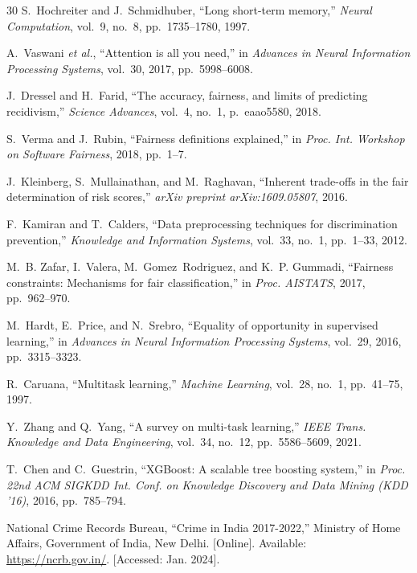 \documentclass[conference]{IEEEtran}
\begin{document}
\begin{thebibliography}{30}
S.~Hochreiter and J.~Schmidhuber, ``Long short-term memory,'' \textit{Neural Computation}, vol.~9, no.~8, pp.~1735--1780, 1997.

A.~Vaswani \textit{et al.}, ``Attention is all you need,'' in \textit{Advances in Neural Information Processing Systems}, vol.~30, 2017, pp.~5998--6008.

J.~Dressel and H.~Farid, ``The accuracy, fairness, and limits of predicting recidivism,'' \textit{Science Advances}, vol.~4, no.~1, p.~eaao5580, 2018.

S.~Verma and J.~Rubin, ``Fairness definitions explained,'' in \textit{Proc. Int. Workshop on Software Fairness}, 2018, pp.~1--7.

J.~Kleinberg, S.~Mullainathan, and M.~Raghavan, ``Inherent trade-offs in the fair determination of risk scores,'' \textit{arXiv preprint arXiv:1609.05807}, 2016.

F.~Kamiran and T.~Calders, ``Data preprocessing techniques for discrimination prevention,'' \textit{Knowledge and Information Systems}, vol.~33, no.~1, pp.~1--33, 2012.

M.~B. Zafar, I.~Valera, M.~Gomez~Rodriguez, and K.~P. Gummadi, ``Fairness constraints: Mechanisms for fair classification,'' in \textit{Proc. AISTATS}, 2017, pp.~962--970.

M.~Hardt, E.~Price, and N.~Srebro, ``Equality of opportunity in supervised learning,'' in \textit{Advances in Neural Information Processing Systems}, vol.~29, 2016, pp.~3315--3323.

R.~Caruana, ``Multitask learning,'' \textit{Machine Learning}, vol.~28, no.~1, pp.~41--75, 1997.

Y.~Zhang and Q.~Yang, ``A survey on multi-task learning,'' \textit{IEEE Trans. Knowledge and Data Engineering}, vol.~34, no.~12, pp.~5586--5609, 2021.

T.~Chen and C.~Guestrin, ``XGBoost: A scalable tree boosting system,'' in \textit{Proc. 22nd ACM SIGKDD Int. Conf. on Knowledge Discovery and Data Mining (KDD '16)}, 2016, pp.~785--794.

National Crime Records Bureau, ``Crime in India 2017-2022,'' Ministry of Home Affairs, Government of India, New Delhi. [Online]. Available: \url{https://ncrb.gov.in/}. [Accessed: Jan. 2024].


\end{thebibliography}
\end{document}
